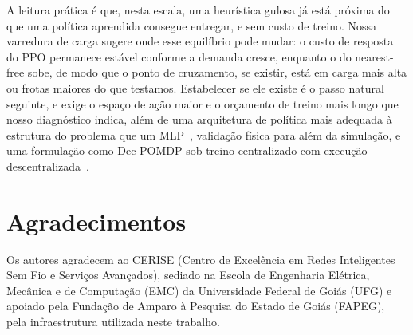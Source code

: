 \documentclass[conference]{IEEEtran}
\begin{document}
A leitura prática é que, nesta escala, uma heurística gulosa já está próxima do que uma política aprendida consegue entregar, e sem custo de treino. Nossa varredura de carga sugere onde esse equilíbrio pode mudar: o custo de resposta do PPO permanece estável conforme a demanda cresce, enquanto o do nearest-free sobe, de modo que o ponto de cruzamento, se existir, está em carga mais alta ou frotas maiores do que testamos. Estabelecer se ele existe é o passo natural seguinte, e exige o espaço de ação maior e o orçamento de treino mais longo que nosso diagnóstico indica, além de uma arquitetura de política mais adequada à estrutura do problema que um MLP~\cite{agrawal2023rtaw,paul2022capsule}, validação física para além da simulação, e uma formulação como Dec-POMDP sob treino centralizado com execução descentralizada~\cite{lowe2017multi}.

\balance
\section*{Agradecimentos}
Os autores agradecem ao CERISE (Centro de Excelência em Redes Inteligentes Sem Fio e Serviços Avançados), sediado na Escola de Engenharia Elétrica, Mecânica e de Computação (EMC) da Universidade Federal de Goiás (UFG) e apoiado pela Fundação de Amparo à Pesquisa do Estado de Goiás (FAPEG), pela infraestrutura utilizada neste trabalho.
\end{document}
